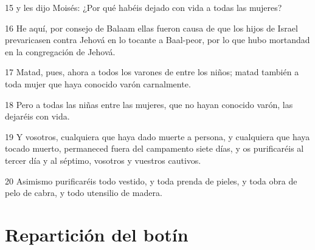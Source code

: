 \par 15 y les dijo Moisés: ¿Por qué habéis dejado con vida a todas las mujeres?
\par 16 He aquí, por consejo de Balaam ellas fueron causa de que los hijos de Israel prevaricasen contra Jehová en lo tocante a Baal-peor, por lo que hubo mortandad en la congregación de Jehová.
\par 17 Matad, pues, ahora a todos los varones de entre los niños; matad también a toda mujer que haya conocido varón carnalmente.
\par 18 Pero a todas las niñas entre las mujeres, que no hayan conocido varón, las dejaréis con vida.
\par 19 Y vosotros, cualquiera que haya dado muerte a persona, y cualquiera que haya tocado muerto, permaneced fuera del campamento siete días, y os purificaréis al tercer día y al séptimo, vosotros y vuestros cautivos.
\par 20 Asimismo purificaréis todo vestido, y toda prenda de pieles, y toda obra de pelo de cabra, y todo utensilio de madera.

\section*{Repartición del botín}

